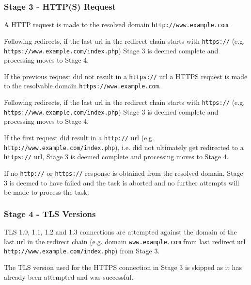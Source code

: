 \documentclass{mscreport}
\begin{document}
\subsubsection{Stage 3 - HTTP(S) Request}

A HTTP request is made to the resolved domain \texttt{http://www.example.com}.

\vspace{0.3cm} \noindent
Following redirects, if the last url in the redirect chain starts with \texttt{https://} (e.g. \texttt{https://www.example.com/index.php}) Stage 3 is deemed complete and processing moves to Stage 4.

\vspace{0.3cm} \noindent
If the previous request did not result in a \texttt{https://} url a HTTPS request is made to the resolvable domain \texttt{https://www.example.com}.

\vspace{0.3cm} \noindent
Following redirects, if the last url in the redirect chain starts with \texttt{https://} (e.g. \newline \texttt{https://www.example.com/index.php}) Stage 3 is deemed complete and processing moves to Stage 4.

\vspace{0.3cm} \noindent
If the first request did result in a \texttt{http://} url (e.g. \texttt{http://www.example.com/index.php}), i.e. did not ultimately get redirected to a \texttt{https://} url, Stage 3 is deemed complete and processing moves to Stage 4.

\vspace{0.3cm} \noindent
If no \texttt{http://} or \texttt{https://} response is obtained from the resolved domain, Stage 3 is deemed to have failed and the task is aborted and no further attempts will be made to process the task.

\subsubsection{Stage 4 - TLS Versions}

TLS 1.0, 1.1, 1.2 and 1.3 connections are attempted against the domain of the last url in the redirect chain (e.g. domain \texttt{www.example.com} from last redirect url \newline \texttt{http://www.example.com/index.php}) from Stage 3.

\vspace{0.3cm} \noindent
The TLS version used for the HTTPS connection in Stage 3 is skipped as it has already been attempted and was successful.
\end{document}

